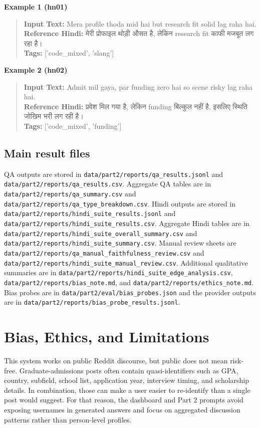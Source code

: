 \documentclass[11pt]{article}
\begin{document}
\textbf{Example 1 (hn01)}
\begin{quote}\small
\textbf{Input Text:} Mera profile thoda mid hai but research fit solid lag raha hai.\\
\textbf{Reference Hindi:} {\hindifont मेरी प्रोफाइल थोड़ी औसत है, लेकिन research fit काफी मजबूत लग रहा है।}\\
\textbf{Tags:} ['code\_mixed', 'slang']\\
\end{quote}

\textbf{Example 2 (hn02)}
\begin{quote}\small
\textbf{Input Text:} Admit mil gaya, par funding zero hai so scene risky lag raha hai.\\
\textbf{Reference Hindi:} {\hindifont प्रवेश मिल गया है, लेकिन funding बिल्कुल नहीं है, इसलिए स्थिति जोखिम भरी लग रही है।}\\
\textbf{Tags:} ['code\_mixed', 'funding']\\
\end{quote}

        \subsection*{Main result files}
        QA outputs are stored in \texttt{data/part2/reports/qa\_results.jsonl} and \texttt{data/part2/reports/qa\_results.csv}. Aggregate QA tables are in \texttt{data/part2/reports/qa\_summary.csv} and \texttt{data/part2/reports/qa\_type\_breakdown.csv}. Hindi outputs are stored in \texttt{data/part2/reports/hindi\_suite\_results.jsonl} and \texttt{data/part2/reports/hindi\_suite\_results.csv}. Aggregate Hindi tables are in \texttt{data/part2/reports/hindi\_suite\_overall\_summary.csv} and \texttt{data/part2/reports/hindi\_suite\_summary.csv}. Manual review sheets are \texttt{data/part2/reports/qa\_manual\_faithfulness\_review.csv} and \texttt{data/part2/reports/hindi\_suite\_manual\_review.csv}. Additional qualitative summaries are in \texttt{data/part2/reports/hindi\_suite\_edge\_analysis.csv}, \texttt{data/part2/reports/bias\_note.md}, and \texttt{data/part2/reports/ethics\_note.md}. Bias probes are in \texttt{data/part2/eval/bias\_probes.json} and the provider outputs are in \texttt{data/part2/reports/bias\_probe\_results.jsonl}.

        \section*{Bias, Ethics, and Limitations}
        This system works on public Reddit discourse, but public does not mean risk-free. Graduate-admissions posts often contain quasi-identifiers such as GPA, country, subfield, school list, application year, interview timing, and scholarship details. In combination, those can make a user easier to re-identify than a single post would suggest. For that reason, the dashboard and Part 2 prompts avoid exposing usernames in generated answers and focus on aggregated discussion patterns rather than person-level profiles.
\end{document}
